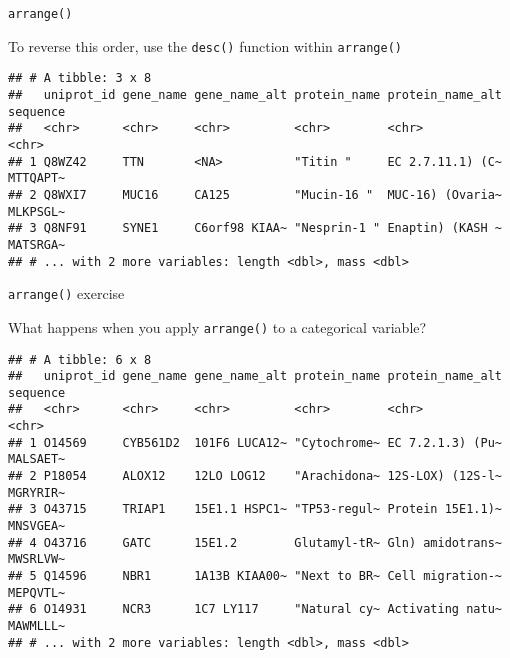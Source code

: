 \documentclass[ignorenonframetext,]{beamer}
\newenvironment{Shaded}{\begin{snugshade}}{\end{snugshade}}
\newcommand{\DecValTok}[1]{\textcolor[rgb]{0.00,0.00,0.81}{#1}}
\newcommand{\KeywordTok}[1]{\textcolor[rgb]{0.13,0.29,0.53}{\textbf{#1}}}
\newcommand{\NormalTok}[1]{#1}
\newcommand{\OperatorTok}[1]{\textcolor[rgb]{0.81,0.36,0.00}{\textbf{#1}}}
\newcommand{\StringTok}[1]{\textcolor[rgb]{0.31,0.60,0.02}{#1}}
\begin{document}
\begin{frame}[fragile]{\texttt{arrange()}}
\protect\hypertarget{arrange-1}{}

To reverse this order, use the \texttt{desc()} function within
\texttt{arrange()}

\begin{Shaded}
\end{Shaded}

\begin{verbatim}
## # A tibble: 3 x 8
##   uniprot_id gene_name gene_name_alt protein_name protein_name_alt sequence
##   <chr>      <chr>     <chr>         <chr>        <chr>            <chr>   
## 1 Q8WZ42     TTN       <NA>          "Titin "     EC 2.7.11.1) (C~ MTTQAPT~
## 2 Q8WXI7     MUC16     CA125         "Mucin-16 "  MUC-16) (Ovaria~ MLKPSGL~
## 3 Q8NF91     SYNE1     C6orf98 KIAA~ "Nesprin-1 " Enaptin) (KASH ~ MATSRGA~
## # ... with 2 more variables: length <dbl>, mass <dbl>
\end{verbatim}

\end{frame}

\begin{frame}[fragile]{\texttt{arrange()} exercise}
\protect\hypertarget{arrange-exercise}{}

What happens when you apply \texttt{arrange()} to a categorical
variable?

\begin{Shaded}
\end{Shaded}

\begin{verbatim}
## # A tibble: 6 x 8
##   uniprot_id gene_name gene_name_alt protein_name protein_name_alt sequence
##   <chr>      <chr>     <chr>         <chr>        <chr>            <chr>   
## 1 O14569     CYB561D2  101F6 LUCA12~ "Cytochrome~ EC 7.2.1.3) (Pu~ MALSAET~
## 2 P18054     ALOX12    12LO LOG12    "Arachidona~ 12S-LOX) (12S-l~ MGRYRIR~
## 3 O43715     TRIAP1    15E1.1 HSPC1~ "TP53-regul~ Protein 15E1.1)~ MNSVGEA~
## 4 O43716     GATC      15E1.2        Glutamyl-tR~ Gln) amidotrans~ MWSRLVW~
## 5 Q14596     NBR1      1A13B KIAA00~ "Next to BR~ Cell migration-~ MEPQVTL~
## 6 O14931     NCR3      1C7 LY117     "Natural cy~ Activating natu~ MAWMLLL~
## # ... with 2 more variables: length <dbl>, mass <dbl>
\end{verbatim}

\end{frame}
\end{document}
